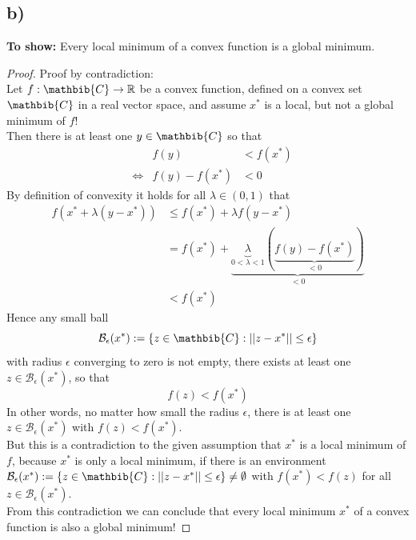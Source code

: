 \documentclass[a4paper]{article}
\begin{document}
    \subsection*{b)}
        \textbf{To show:} Every local minimum of a convex function is a global minimum.
        \begin{proof}
            Proof by contradiction:\\
            Let $f: \mathbib{C} \rightarrow \mathbb{R}$ be a convex function, defined on a convex set $\mathbib{C}$ in a real vector space, and assume $x^*$ is a local, but not a global minimum of $f$!\\
            Then there is at least one $y \in \mathbib{C}$ so that
            \begin{align}
                & & f(y) &< f(x^*)\\
                &\Leftrightarrow & f(y) - f(x^*) &< 0
            \end{align}
            By definition of convexity it holds for all $\lambda \in (0,1)$ that
            \begin{align}
                f(x^* + \lambda (y - x^*)) &\leq f(x^*) + \lambda f(y - x^*)\\
                &= f(x^*) + \underbrace{\underbrace{\lambda}_{0 < \lambda < 1} (\underbrace{f(y) - f(x^*)}_{< 0})}_{< 0}\\
                &< f(x^*)
            \end{align}
            Hence any small ball
            $$\mathcal{B}_{\epsilon}(x^*) := \{z \in \mathbib{C} : ||z-x^*|| \leq \epsilon\}$$
            with radius $\epsilon$ converging to zero is not empty, there exists at least one $z \in \mathcal{B}_{\epsilon}(x^*)$, so that
            $$f(z) < f(x^*)$$
            In other words, no matter how small the radius $\epsilon$, there is at least one $z \in \mathcal{B}_{\epsilon}(x^*)$ with $f(z) < f(x^*)$.\\
            But this is a contradiction to the given assumption that $x^*$ is a local minimum of $f$, because $x^*$ is only a local minimum, if there is an environment $\mathcal{B}_{\epsilon}(x^*) := \{z \in \mathbib{C} : ||z-x^*|| \leq \epsilon\} \neq \emptyset$ with $f(x^*) < f(z)$ for all $z \in \mathcal{B}_{\epsilon}(x^*)$.\\
            From this contradiction we can conclude that every local minimum $x^*$ of a convex function is also a global minimum!
        \end{proof}
        
\end{document}
